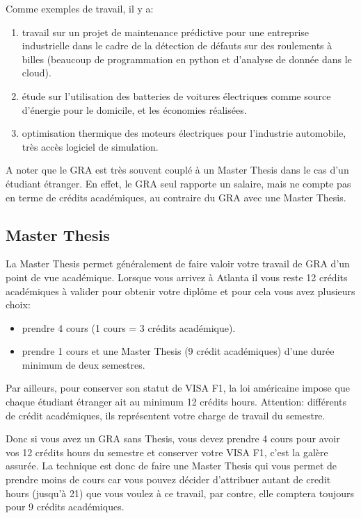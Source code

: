 \documentclass{article}
\begin{document}
Comme exemples de travail, il y a: 
\begin{enumerate}
\item travail sur un projet de maintenance prédictive pour une entreprise industrielle dans le cadre de la détection de défauts sur des roulements à billes (beaucoup de programmation en python et d'analyse de donnée dans le cloud).
\item étude sur l'utilisation des batteries de voitures électriques comme source d'énergie pour le domicile, et les économies réalisées.
\item optimisation thermique des moteurs électriques pour l'industrie automobile, très accès logiciel de simulation.
\end{enumerate}

A noter que le GRA est très souvent couplé à un Master Thesis dans le cas d'un étudiant étranger. En effet, le GRA seul rapporte un salaire, mais ne compte pas en terme de crédits académiques, au contraire du GRA avec une Master Thesis.

\subsection{Master Thesis}

La Master Thesis permet généralement de faire valoir votre travail de GRA d'un point de vue académique. Lorsque vous arrivez à Atlanta il vous reste 12 crédits académiques à valider pour obtenir votre diplôme et pour cela vous avez plusieurs choix:
\begin{itemize}
\item prendre 4 cours (1 cours = 3 crédits académique).
\item prendre 1 cours et une Master Thesis (9 crédit académiques) d'une durée minimum de deux semestres. 
\end{itemize}

Par ailleurs, pour conserver son statut de VISA F1, la loi américaine impose que chaque étudiant étranger ait au minimum 12 crédits hours. Attention: différents de crédit académiques, ils représentent votre charge de travail du semestre.

Donc si vous avez un GRA sans Thesis, vous devez prendre 4 cours pour avoir vos 12 crédits hours du semestre et conserver votre VISA F1, c'est la galère assurée. La technique est donc de faire une Master Thesis qui vous permet de prendre moins de cours car vous pouvez décider d'attribuer autant de credit hours (jusqu'à 21) que vous voulez à ce travail, par contre, elle comptera toujours pour 9 crédits académiques. 
\end{document}
